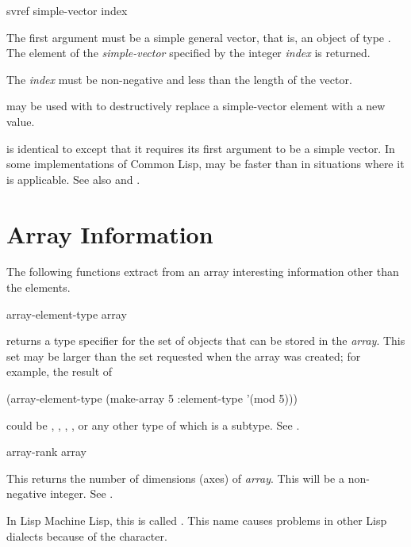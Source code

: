 \begin{defun}[Function]
svref simple-vector index

The first argument must be a simple general vector,
that is, an object of type .
The element of the \emph{simple-vector} specified by the integer \emph{index}
is returned.

The \emph{index} must be non-negative and less than
the length of the vector.

 may be used with  to destructively replace
a simple-vector element with a new value.

 is identical to  except that it requires its first
argument to be a simple vector.  In some implementations of Common Lisp,
 may be faster than  in situations where it is applicable.
See also  and .
\end{defun}

\section{Array Information}

The following functions extract from an array
interesting information other than the elements.

\begin{defun}[Function]
array-element-type array

 returns a type specifier for the set of objects
that can be stored in the \emph{array}.  This set may be larger than the
set requested when the array was created; for example,
the result of
\begin{lisp}
(array-element-type (make-array 5 :element-type '(mod 5)))
\end{lisp}
could be , , , , or any other
type of which  is a subtype.  See .
\end{defun}

\begin{defun}[Function]
array-rank array

This returns the number of dimensions (axes) of \emph{array}.
This will be a non-negative integer.
See .

\beforenoterule
\begin{incompatibility}
In Lisp Machine Lisp, this is called .
This name causes problems in other Lisp dialects
because of the \cd{\#} character.
\end{incompatibility}
\afternoterule
\end{defun}

